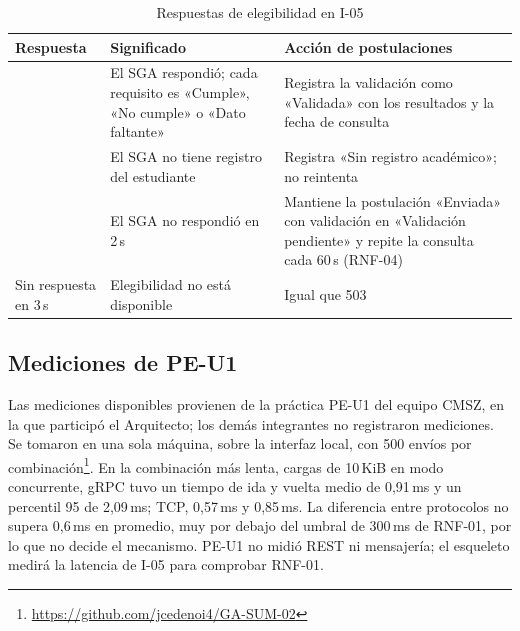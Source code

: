 \begin{table}[htbp]
  \centering
  \caption{Respuestas de elegibilidad en I-05}
  \label{tab:respuestas-i05}
  \small
  \begin{tabularx}{\textwidth}{@{}>{\raggedright\arraybackslash}p{2.1cm}
                                  >{\raggedright\arraybackslash}X
                                  >{\raggedright\arraybackslash}X@{}}
    \toprule
    \textbf{Respuesta} & \textbf{Significado} & \textbf{Acción de postulaciones} \\
    \midrule
    200 & El SGA respondió; cada requisito es «Cumple», «No cumple» o «Dato faltante» & Registra la validación como «Validada» con los resultados y la fecha de consulta \\
    404 & El SGA no tiene registro del estudiante & Registra «Sin registro académico»; no reintenta \\
    503 & El SGA no respondió en 2\,s & Mantiene la postulación «Enviada» con validación en «Validación pendiente» y repite la consulta cada 60\,s (RNF-04) \\
    Sin respuesta en 3\,s & Elegibilidad no está disponible & Igual que 503 \\
    \bottomrule
  \end{tabularx}
\end{table}

\subsection{Mediciones de PE-U1}

Las mediciones disponibles provienen de la práctica PE-U1 del equipo CMSZ, en la que participó el Arquitecto; los demás integrantes no registraron mediciones. Se tomaron en una sola máquina, sobre la interfaz local, con 500 envíos por combinación\footnote{\url{https://github.com/jcedenoi4/GA-SUM-02}}. En la combinación más lenta, cargas de 10\,KiB en modo concurrente, gRPC tuvo un tiempo de ida y vuelta medio de 0,91\,ms y un percentil 95 de 2,09\,ms; TCP, 0,57\,ms y 0,85\,ms. La diferencia entre protocolos no supera 0,6\,ms en promedio, muy por debajo del umbral de 300\,ms de RNF-01, por lo que no decide el mecanismo. PE-U1 no midió REST ni mensajería; el esqueleto medirá la latencia de I-05 para comprobar RNF-01.
